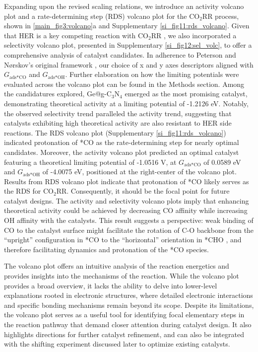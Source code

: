 Expanding upon the revised scaling relations, we introduce an activity volcano plot and a rate-determining step (RDS) volcano plot for the CO$_2$RR process, shown in \cref{main_fig3:volcano}a and Supplementary \cref{si_fig11:rds_volcano}.
Given that HER is a key competing reaction with CO$_2$RR \cite{goyal2020competition}, we also incorporated a selectivity volcano plot, presented in Supplementary \cref{si_fig12:sel_volc}, to offer a comprehensive analysis of catalyst candidates.
In adherence to Peterson and Nørskov's original framework \cite{peterson2012activity}, our choice of x and y axes descriptors aligned with $\textit{G}_{\text{ads} \ast \text{CO}}$ and $\textit{G}_{\text{ads} \ast \text{OH}}$.
Further elaboration on how the limiting potentials were evaluated across the volcano plot can be found in the Methods section.
Among the candidatures explored, Ge@g-C$_3$N$_4$ emerged as the most promising catalyst, demonstrating theoretical activity at a limiting potential of -1.2126 eV.
Notably, the observed selectivity trend paralleled the activity trend, suggesting that catalysts exhibiting high theoretical activity are also resistant to HER side reactions.
The RDS volcano plot (Supplementary \cref{si_fig11:rds_volcano}) indicated protonation of *CO as the rate-determining step for nearly optimal candidates.
Moreover, the activity volcano plot predicted an optimal catalyst featuring a theoretical limiting potential of -1.0516 V, at $\textit{G}_{\text{ads} \ast \text{CO}}$ of 0.0589 eV and $\textit{G}_{\text{ads} \ast \text{OH}}$ of -4.0075 eV, positioned at the right-center of the volcano plot.
Results from RDS volcano plot indicate that protonation of *CO likely serves as the RDS for CO$_2$RR.
Consequently, it should be the focal point for future catalyst designs.
The activity and selectivity volcano plots imply that enhancing theoretical activity could be achieved by decreasing CO affinity while increasing OH affinity with the catalysts.
This result suggests a perspective: weak binding of CO to the catalyst surface might facilitate the rotation of C-O backbone from the “upright” configuration in *CO to the “horizontal” orientation in *CHO \cite{peterson2010copper},
and therefore facilitating dynamics and protonation of the *CO species.

The volcano plot offers an intuitive analysis of the reaction energetics and provides insights into the mechanisms of the reaction.
While the volcano plot provides a broad overview, it lacks the ability to delve into lower-level explanations rooted in electronic structures, where detailed electronic interactions and specific bonding mechanisms remain beyond its scope.
Despite its limitations, the volcano plot serves as a useful tool for identifying focal elementary steps in the reaction pathway that demand closer attention during catalyst design.
It also highlights directions for further catalyst refinement, and can also be integrated with the shifting experiment discussed later to optimize existing catalysts.

